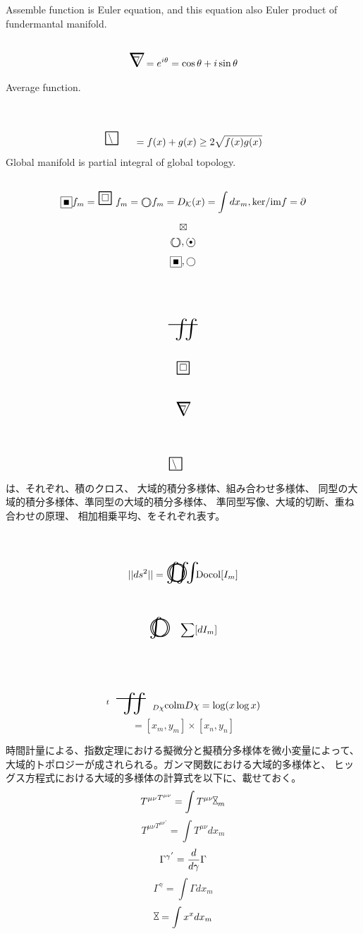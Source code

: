 \documentclass{jsarticle}
\begin{document}
  \newcommand{\whitewithboder}{%
	  \begin{picture}(15,30)
		  \put(0,0){\scalebox{2.0}[2]{$\square$}}
		  \put(4,4){$\square$}
	  \end{picture}%
  } 
  \newcommand{\whitewithnabla}{%
	  \begin{picture}(15,30)
		  \put(0,0){\scalebox{2.0}[2]{$\nabla$}}
		  \put(3,3){$\nabla$}
	  \end{picture}%
  } 


  Assemble function is Euler equation, and this equation also
  Euler product of fundermantal manifold.
  $$ \whitewithnabla = e^{i\theta} = \cos \theta + i \sin \theta $$

  Average function.
  $$ \average = {{f(x) + g(x)}} \ge 2{\sqrt{f(x)g(x)}} $$
  Global manifold is partial integral of global topology.
 $$ \whitewithblacksquare f_m =  \whitewithboder \text{                 
      } f_m = 
 \whitewithbodercircle f_m = 
  D_{\mathcal{K}}(x) = \int dx_m , \mathrm{ker}/\mathrm{im}f = 
  \partial $$

$$\boxtimes$$
$$\whitewithbodercircle, \whitewithblack $$
$$\whitewithblacksquare,\whitewithwhitecircle$$
$$\scalebox{2.0}[2]{\variint}$$ 
$$\whitewithboder$$ 
$$ \whitewithnabla$$
$$\average$$ 
は、それぞれ、積のクロス、 大域的積分多様体、組み合わせ多様体、
同型の大域的積分多様体、準同型の大域的積分多様体、
準同型写像、大域的切断、重ね合わせの原理、
相加相乗平均、をそれぞれ表す。
 

$$||ds^2||=\whitewithbodercircleiiint \mathrm{Docol}[I_m]$$
$$  \whitewithbodercircleint \sum[dI_m]$$

$$ {}^t\scalebox{2.0}[2]{\variint}_{D\chi}\mathrm{colm}D\chi = \log(x\log x)$$
$$ = [x_m,y_m]\times [x_n,y_n] $$

\newcommand{\timebow}{%
	\begin{picture}(5,5)
		\put(0,0){$\text{\rotatebox{90}{$\bowtie$}}$}
	\end{picture} %
	}


 \newcommand{\flowerletter}{%
	 \begin{picture}(10,20)
		 \put(0,0){$\text{\scalebox{1.0}[1]{$\square$}}$}
		 \put(0,0){$\text{\scalebox{1.0}[2]{$\int$}}$}
	 \end{picture} %
	 }



       時間計量による、指数定理における擬微分と擬積分多様体を微小変量によって、
   大域的トポロジーが成されられる。ガンマ関数における大域的多様体と、
   ヒッグス方程式における大域的多様体の計算式を以下に、載せておく。
   $$ {T^{\mu\nu}}^{T^{\mu\nu}} = \int T^{\mu\nu} \rotatebox{90}{$\bowtie$}_m $$
   $$   {T^{\mu\nu}}^{{T^{\mu\nu}}^{'}}=\int T^{\mu\nu}dx_m  $$
      $$ {\Gamma^{\gamma}}^{'} = {d \over {d \gamma}}\Gamma $$
   $$ \Gamma^{\gamma} = \int \Gamma dx_m $$
   $$ \rotatebox{90}{$\bowtie$} = \int x^x dx_m $$
\end{document}

